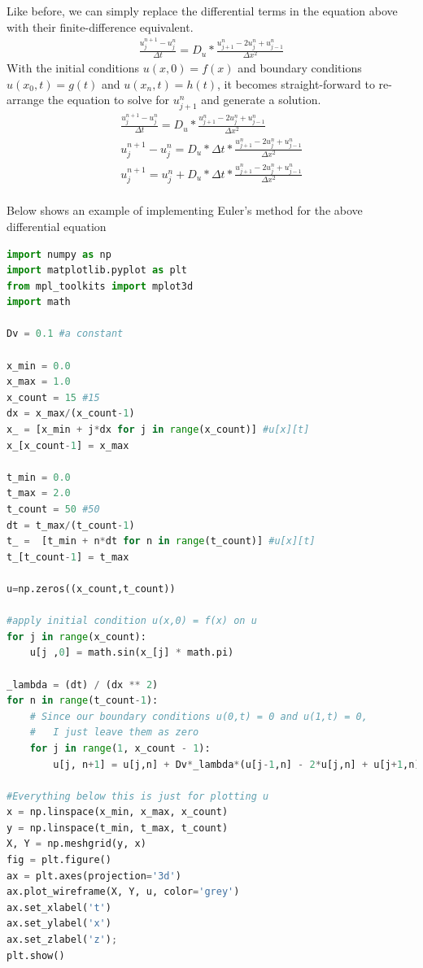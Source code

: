 \documentclass[11pt]{article}
\begin{document}
Like before, we can simply replace the differential terms in the equation above with their finite-difference equivalent.
\begin{align*}
    \frac{u^{n+1}_{j}-u^{n}_{j}}{\Delta t} = D_u * \frac{u^{n}_{j+1}-2u^{n}_{j}+u^{n}_{j-1}}{\Delta x^2}
\end{align*}
With the initial conditions $u(x,0) = f(x)$ and boundary conditions $u(x_0,t) = g(t)$ and $u(x_n,t) = h(t)$, it becomes straight-forward to re-arrange the equation to solve for $u^{n}_{j+1}$ and generate a solution.
\begin{align*}
    \frac{u^{n+1}_{j}-u^{n}_{j}}{\Delta t} = D_u * \frac{u^{n}_{j+1}-2u^{n}_{j}+u^{n}_{j-1}}{\Delta x^2}\\
    u^{n+1}_{j} - u^{n}_{j}= D_u *\Delta t*    \frac{u^{n}_{j+1}-2u^{n}_{j}+u^{n}_{j-1}}{\Delta x^2}\\
    u^{n+1}_{j} = u^{n}_{j} + D_u *\Delta t*    \frac{u^{n}_{j+1}-2u^{n}_{j}+u^{n}_{j-1}}{\Delta x^2}\\
\end{align*}

Below shows an example of implementing Euler's method for the above differential equation
\begin{lstlisting}[language=Python]
import numpy as np
import matplotlib.pyplot as plt
from mpl_toolkits import mplot3d
import math

Dv = 0.1 #a constant

x_min = 0.0
x_max = 1.0
x_count = 15 #15
dx = x_max/(x_count-1)
x_ = [x_min + j*dx for j in range(x_count)] #u[x][t]
x_[x_count-1] = x_max

t_min = 0.0
t_max = 2.0
t_count = 50 #50
dt = t_max/(t_count-1)
t_ =  [t_min + n*dt for n in range(t_count)] #u[x][t]
t_[t_count-1] = t_max

u=np.zeros((x_count,t_count))

#apply initial condition u(x,0) = f(x) on u
for j in range(x_count):
    u[j ,0] = math.sin(x_[j] * math.pi)

_lambda = (dt) / (dx ** 2)
for n in range(t_count-1):
    # Since our boundary conditions u(0,t) = 0 and u(1,t) = 0,
    #   I just leave them as zero
    for j in range(1, x_count - 1):
        u[j, n+1] = u[j,n] + Dv*_lambda*(u[j-1,n] - 2*u[j,n] + u[j+1,n])

#Everything below this is just for plotting u
x = np.linspace(x_min, x_max, x_count)
y = np.linspace(t_min, t_max, t_count)
X, Y = np.meshgrid(y, x)
fig = plt.figure()
ax = plt.axes(projection='3d')
ax.plot_wireframe(X, Y, u, color='grey')
ax.set_xlabel('t')
ax.set_ylabel('x')
ax.set_zlabel('z');
plt.show()
\end{lstlisting}
\end{document}
